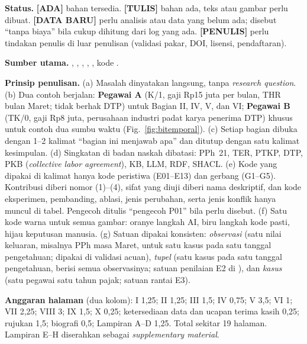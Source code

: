 \documentclass{ieeeaccess}
\newcommand{\ADA}{\textcolor{stada}{\textbf{[ADA]}}}
\newcommand{\TULIS}{\textcolor{sttulis}{\textbf{[TULIS]}}}
\newcommand{\BARU}{\textcolor{stbaru}{\textbf{[DATA BARU]}}}
\newcommand{\PENULIS}{\textcolor{stpenulis}{\textbf{[PENULIS]}}}
\newenvironment{isi}{\par\smallskip\footnotesize\color{draftblue}\noindent}{\par\smallskip\normalsize\color{black}}
\begin{document}
\begin{isi}
\textbf{Status.} \ADA{} bahan tersedia. \TULIS{} bahan ada, teks atau gambar perlu dibuat. \BARU{} perlu analisis atau data yang belum ada; disebut ``tanpa biaya'' bila cukup dihitung dari log yang ada. \PENULIS{} perlu tindakan penulis di luar penulisan (validasi pakar, DOI, lisensi, pendaftaran).

\textbf{Sumber utama.} , , , , , kode .

\textbf{Prinsip penulisan.}
(a) Masalah dinyatakan langsung, tanpa \textit{research question}.
(b) Dua contoh berjalan: \textbf{Pegawai A} (K/1, gaji Rp15 juta per bulan, THR bulan Maret; tidak berhak DTP) untuk Bagian II, IV, V, dan VI; \textbf{Pegawai B} (TK/0, gaji Rp8 juta, perusahaan industri padat karya penerima DTP) khusus untuk contoh dua sumbu waktu (Fig.~\ref{fig:bitemporal}).
(c) Setiap bagian dibuka dengan 1--2 kalimat ``bagian ini menjawab apa'' dan ditutup dengan satu kalimat kesimpulan.
(d) Singkatan di badan naskah dibatasi: PPh~21, TER, PTKP, DTP, PKB (\textit{collective labor agreement}), KB, LLM, RDF, SHACL.
(e) Kode yang dipakai di kalimat hanya kode peristiwa (E01--E13) dan gerbang (G1--G5). Kontribusi diberi nomor (1)--(4), sifat yang diuji diberi nama deskriptif, dan kode eksperimen, pembanding, ablasi, jenis perubahan, serta jenis konflik hanya muncul di tabel. Pengecoh ditulis ``pengecoh P01'' bila perlu disebut.
(f) Satu kode warna untuk semua gambar: oranye langkah AI, biru langkah kode pasti, hijau keputusan manusia.
(g) Satuan dipakai konsisten: \emph{observasi} (satu nilai keluaran, misalnya PPh masa Maret, untuk satu kasus pada satu tanggal pengetahuan; dipakai di validasi acuan), \emph{tupel} (satu kasus pada satu tanggal pengetahuan, berisi semua observasinya; satuan penilaian E2 di ), dan \emph{kasus} (satu pegawai satu tahun pajak; satuan rantai E3).

\textbf{Anggaran halaman} (dua kolom): I 1,25; II 1,25; III 1,5; IV 0,75; V 3,5; VI 1; VII 2,25; VIII 3; IX 1,5; X 0,25; ketersediaan data dan ucapan terima kasih 0,25; rujukan 1,5; biografi 0,5; Lampiran A--D 1,25. Total sekitar 19 halaman. Lampiran E--H diserahkan sebagai \textit{supplementary material}.


\end{isi}
\end{document}
